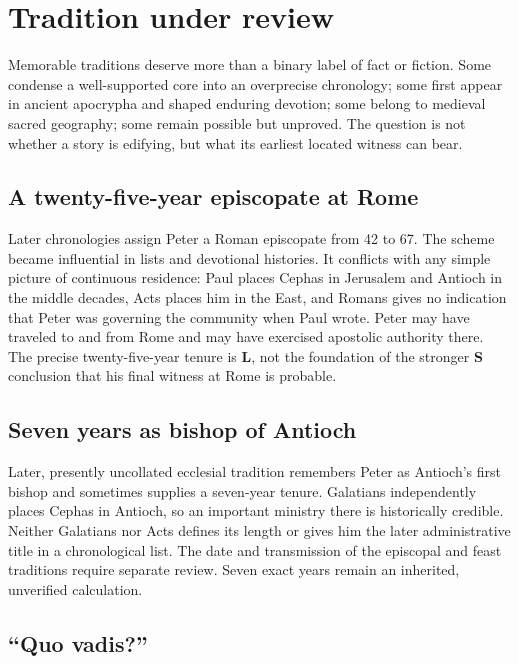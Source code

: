 \section{Tradition under review}\label{sec:peter-tradition}

Memorable traditions deserve more than a binary label of fact or fiction.
Some condense a well-supported core into an overprecise chronology; some
first appear in ancient apocrypha and shaped enduring devotion; some belong to
medieval sacred geography; some remain possible but unproved. The question is
not whether a story is edifying, but what its earliest located witness can
bear.

\subsection{A twenty-five-year episcopate at Rome}

Later chronologies assign Peter a Roman episcopate from 42 to 67. The scheme
became influential in lists and devotional histories. It conflicts with any
simple picture of continuous residence: Paul places Cephas in Jerusalem and
Antioch in the middle decades, Acts places him in the East, and Romans gives
no indication that Peter was governing the community when Paul wrote. Peter
may have traveled to and from Rome and may have exercised apostolic authority
there. The precise twenty-five-year tenure is \textbf{L}, not the foundation
of the stronger \textbf{S} conclusion that his final witness at Rome is
probable.

\subsection{Seven years as bishop of Antioch}

Later, presently uncollated ecclesial tradition remembers Peter as Antioch's
first bishop and sometimes supplies a seven-year tenure. Galatians independently
places Cephas in Antioch, so an important ministry there is historically
credible. Neither Galatians nor Acts defines its length or gives him the later
administrative title in a chronological list. The date and transmission of the
episcopal and feast traditions require separate review. Seven exact years
remain an inherited, unverified calculation.

\subsection{``Quo vadis?''}

